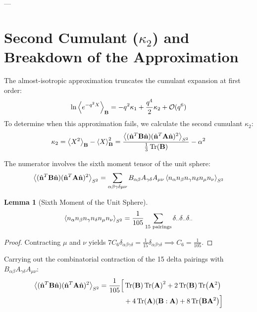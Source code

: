 \documentclass[11pt,a4paper]{article}
\theoremstyle{definition}
\newtheorem{lemma}{Lemma}
\begin{document}
---

\section{Second Cumulant ($\kappa_2$) and Breakdown of the Approximation}
\label{sec:cumulant2_breakdown}

The almost-isotropic approximation truncates the cumulant expansion at first order:
\begin{equation}
\ln \ev{e^{-q^2 X}}_{\mathbf{B}} = -q^2 \kappa_1 + \frac{q^4}{2} \kappa_2 + \mathcal{O}(q^6)
\end{equation}
To determine when this approximation fails, we calculate the second cumulant $\kappa_2$:
\begin{equation}
\kappa_2 = \ev{X^2}_{\mathbf{B}} - \ev{X}_{\mathbf{B}}^2 = \frac{\ev{(\hat{\mathbf{n}}^T \mathbf{B} \hat{\mathbf{n}})(\hat{\mathbf{n}}^T \mathbf{A} \hat{\mathbf{n}})^2}_{S^2}}{\frac{1}{3}\Tr(\mathbf{B})} - \alpha^2
\label{eq:kappa2_def}
\end{equation}

The numerator involves the sixth moment tensor of the unit sphere:
\begin{equation}
\ev{(\hat{\mathbf{n}}^T \mathbf{B} \hat{\mathbf{n}})(\hat{\mathbf{n}}^T \mathbf{A} \hat{\mathbf{n}})^2}_{S^2} = \sum_{\alpha\beta\gamma\delta\mu\nu} B_{\alpha\beta} A_{\gamma\delta} A_{\mu\nu} \ev{n_\alpha n_\beta n_\gamma n_\delta n_\mu n_\nu}_{S^2}
\end{equation}

\begin{lemma}[Sixth Moment of the Unit Sphere]
\begin{equation}
\ev{n_\alpha n_\beta n_\gamma n_\delta n_\mu n_\nu}_{S^2} = \frac{1}{105} \sum_{15 \text{ pairings}} \delta_{\cdot\cdot}\delta_{\cdot\cdot}\delta_{\cdot\cdot}
\end{equation}
\end{lemma}
\begin{proof}
Contracting $\mu$ and $\nu$ yields $7 C_6 \delta_{\alpha\beta\gamma\delta} = \frac{1}{15}\delta_{\alpha\beta\gamma\delta} \implies C_6 = \frac{1}{105}$.
\end{proof}

Carrying out the combinatorial contraction of the 15 delta pairings with $B_{\alpha\beta} A_{\gamma\delta} A_{\mu\nu}$:
\begin{align}
\ev{(\hat{\mathbf{n}}^T \mathbf{B} \hat{\mathbf{n}})(\hat{\mathbf{n}}^T \mathbf{A} \hat{\mathbf{n}})^2}_{S^2} = \frac{1}{105} \Big[ & \Tr(\mathbf{B}) \Tr(\mathbf{A})^2 + 2 \Tr(\mathbf{B}) \Tr(\mathbf{A}^2) \nonumber \\
& + 4 \Tr(\mathbf{A}) (\mathbf{B}:\mathbf{A}) + 8 \Tr(\mathbf{B}\mathbf{A}^2) \Big]
\end{align}
\end{document}

